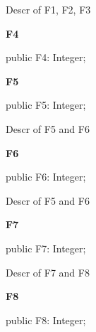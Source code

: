 \documentclass{report}
\newif\ifpdf
\begin{document}
\begin{list}{}
\par Descr of F1, F2, F3\label{ok_multiple_fields.TRec2-F4}
\item[\textbf{F4}\hfill]
\ifpdf
\begin{flushleft}
\fi
\begin{ttfamily}
public F4: Integer;\end{ttfamily}

\ifpdf
\end{flushleft}
\fi


\par  \label{ok_multiple_fields.TRec2-F5}
\item[\textbf{F5}\hfill]
\ifpdf
\begin{flushleft}
\fi
\begin{ttfamily}
public F5: Integer;\end{ttfamily}

\ifpdf
\end{flushleft}
\fi


\par Descr of F5 and F6\label{ok_multiple_fields.TRec2-F6}
\item[\textbf{F6}\hfill]
\ifpdf
\begin{flushleft}
\fi
\begin{ttfamily}
public F6: Integer;\end{ttfamily}

\ifpdf
\end{flushleft}
\fi


\par Descr of F5 and F6\label{ok_multiple_fields.TRec2-F7}
\item[\textbf{F7}\hfill]
\ifpdf
\begin{flushleft}
\fi
\begin{ttfamily}
public F7: Integer;\end{ttfamily}

\ifpdf
\end{flushleft}
\fi


\par Descr of F7 and F8\label{ok_multiple_fields.TRec2-F8}
\item[\textbf{F8}\hfill]
\ifpdf
\begin{flushleft}
\fi
\begin{ttfamily}
public F8: Integer;\end{ttfamily}

\ifpdf
\end{flushleft}
\fi



\end{list}
\end{document}
